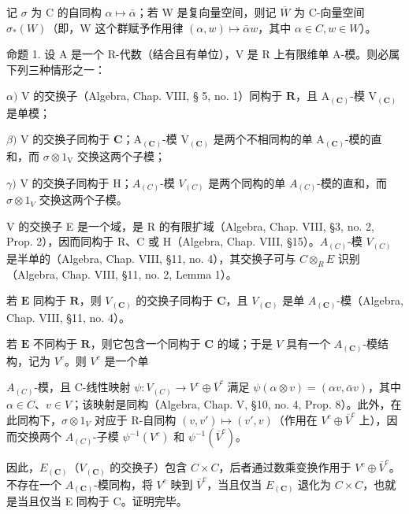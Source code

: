 
记 \(\sigma\) 为 C 的自同构 \(\alpha\mapsto\bar{\alpha}\)；若 W 是复向量空间，则记 \(\overline{W}\) 为 C-向量空间 \(\sigma_{*}(W)\)（即，W 这个群赋予作用律 \((\alpha,w)\mapsto\bar{\alpha}w\)，其中 \(\alpha\in C, w\in W\)）。

命题 1. 设 A 是一个 R-代数（结合且有单位），V 是 R 上有限维单 A-模。则必属下列三种情形之一：

\(\alpha)\) V 的交换子（Algebra, Chap. VIII, § 5, no. 1）同构于 \(\mathbf{R}\)，且 \(\mathrm{A}_{(\mathbf{C})}\)-模 \(\mathrm{V}_{(\mathbf{C})}\) 是单模；

\(\beta)\) V 的交换子同构于 \(\mathbf{C}\)；\(\mathrm{A}_{(\mathbf{C})}\)-模 \(\mathrm{V}_{(\mathbf{C})}\) 是两个不相同构的单 \(\mathrm{A}_{(\mathbf{C})}\)-模的直和，而 \(\sigma \otimes 1_{\mathrm{V}}\) 交换这两个子模；

\(\gamma)\) V 的交换子同构于 H；\(A_{(C)}\)-模 \(V_{(C)}\) 是两个同构的单 \(A_{(C)}\)-模的直和，而 \(\sigma \otimes 1_V\) 交换这两个子模。

V 的交换子 E 是一个域，是 R 的有限扩域（Algebra, Chap. VIII, §3, no. 2, Prop. 2），因而同构于 R、C 或 H（Algebra, Chap. VIII, §15）。\(A_{(C)}\)-模 \(V_{(C)}\) 是半单的（Algebra, Chap. VIII, §11, no. 4），其交换子可与 \(C \otimes_{R} E\) 识别（Algebra, Chap. VIII, §11, no. 2, Lemma 1）。

若 \(\mathbf{E}\) 同构于 \(\mathbf{R}\)，则 \(V_{(\mathbf{C})}\) 的交换子同构于 \(\mathbf{C}\)，且 \(V_{(\mathbf{C})}\) 是单 \(A_{(\mathbf{C})}\)-模（Algebra, Chap. VIII, §11, no. 4）。

若 \(\mathbf{E}\) 不同构于 \(\mathbf{R}\)，则它包含一个同构于 \(\mathbf{C}\) 的域；于是 \(V\) 具有一个 \(A_{(\mathbf{C})}\)-模结构，记为 \(V^c\)。则 \(V^c\) 是一个单

\(A_{(C)}\)-模，且 C-线性映射 \(\psi: V_{(C)} \to V^{c} \oplus \overline{V}^{c}\) 满足 \(\psi(\alpha \otimes v) = (\alpha v, \bar{\alpha} v)\)，其中 \(\alpha \in C\)、\(v \in V\)；该映射是同构（Algebra, Chap. V, §10, no. 4, Prop. 8）。此外，在此同构下，\(\sigma \otimes 1_{V}\) 对应于 R-自同构 \((v, v') \mapsto (v', v)\)（作用在 \(V^{c} \oplus \overline{V}^{c}\) 上），因而交换两个 \(A_{(C)}\)-子模 \(\psi^{-1}(V^{c})\) 和 \(\psi^{-1}(\overline{V}^{c})\)。

因此，\(E_{(\mathbf{C})}\)（\(V_{(\mathbf{C})}\) 的交换子）包含 \(C \times C\)，后者通过数乘变换作用于 \(V^{c} \oplus \overline{V}^{c}\)。不存在一个 \(A_{(\mathbf{C})}\)-模同构，将 \(V^{c}\) 映到 \(\overline{V}^{c}\)，当且仅当 \(E_{(\mathbf{C})}\) 退化为 \(C \times C\)，也就是当且仅当 E 同构于 C。证明完毕。

